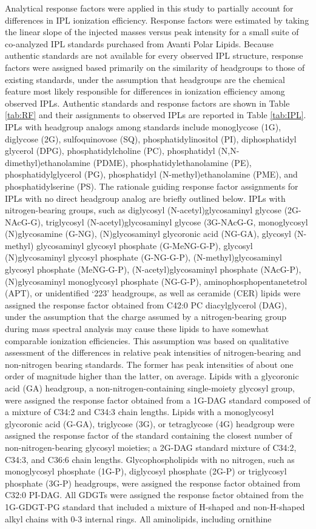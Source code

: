 Analytical response factors were applied in this study to partially account for differences in IPL ionization efficiency. Response factors were estimated by taking the linear slope of the injected masses versus peak intensity for a small suite of co-analyzed IPL standards purchased from Avanti Polar Lipids. Because authentic standards are not available for every observed IPL structure, response factors were assigned based primarily on the similarity of headgroups to those of existing standards, under the assumption that headgroups are the chemical feature most likely responsible for differences in ionization efficiency among observed IPLs. Authentic standards and response factors are shown in Table \ref{tab:RF} and their assignments to observed IPLs are reported in Table \ref{tab:IPL}. IPLs with headgroup analogs among standards include monoglycose (1G), diglycose (2G), sulfoquinovose (SQ), phosphatidylinositol (PI), diphosphatidyl glycerol (DPG), phosphatidylcholine (PC), phosphatidyl (N,N-dimethyl)ethanolamine (PDME), phosphatidylethanolamine (PE), phosphatidylglycerol (PG), phosphatidyl (N-methyl)ethanolamine (PME), and phosphatidylserine (PS). The rationale guiding response factor assignments for IPLs with no direct headgroup analog are briefly outlined below. IPLs with nitrogen-bearing groups, such as diglycosyl (N-acetyl)glycosaminyl glycose (2G-NAcG-G), triglycosyl (N-acetyl)glycosaminyl glycose (3G-NAcG-G, monoglycosyl (N)glycosamine (G-NG), (N)glycosaminyl glycoronic acid (NG-GA), glycosyl (N-methyl) glycosaminyl glycosyl phosphate (G-MeNG-G-P), glycosyl (N)glycosaminyl glycosyl phosphate (G-NG-G-P), (N-methyl)glycosaminyl glycosyl phosphate (MeNG-G-P), (N-acetyl)glycosaminyl phosphate (NAcG-P), (N)glycosaminyl monoglycosyl phosphate (NG-G-P), aminophosphopentanetetrol (APT), or unidentified `223' headgroups, as well as ceramide (CER) lipids were assigned the response factor obtained from C42:0 PC diacylglycerol (DAG), under the assumption that the charge assumed by a nitrogen-bearing group during mass spectral analysis may cause these lipids to have somewhat comparable ionization efficiencies. This assumption was based on qualitative assessment of the differences in relative peak intensities of nitrogen-bearing and non-nitrogen bearing standards. The former has peak intensities of about one order of magnitude higher than the latter, on average. Lipids with a glycoronic acid (GA) headgroup, a non-nitrogen-containing single-moiety glycosyl group, were assigned the response factor obtained from a 1G-DAG standard composed of a mixture of C34:2 and C34:3 chain lengths. Lipids with a monoglycosyl glycoronic acid (G-GA), triglycose (3G), or tetraglycose (4G) headgroup were assigned the response factor of the standard containing the closest number of non-nitrogen-bearing glycosyl moieties; a 2G-DAG standard mixture of C34:2, C34:3, and C36:6 chain lengths. Glycophospholipids with no nitrogen, such as monoglycosyl phosphate (1G-P), diglycosyl phosphate (2G-P) or triglycosyl phosphate (3G-P) headgroups, were assigned the response factor obtained from C32:0 PI-DAG. All GDGTs were assigned the response factor obtained from the 1G-GDGT-PG standard that included a mixture of H-shaped and non-H-shaped alkyl chains with 0-3 internal rings. All aminolipids, including ornithine 